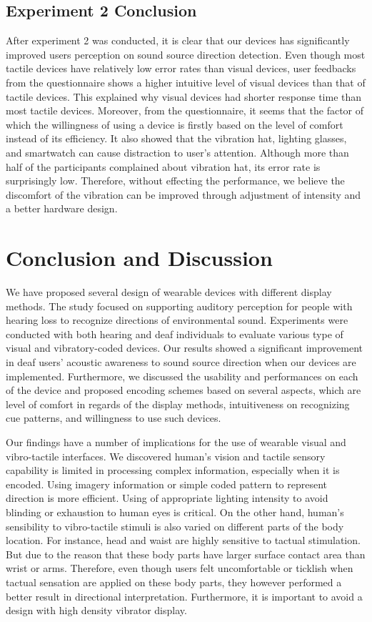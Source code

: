 \documentclass{sigchi}
\begin{document}
\subsection{Experiment 2 Conclusion}
After experiment 2 was conducted, it is clear that our devices has significantly improved users perception on sound source direction detection. Even though most tactile devices have relatively low error rates than visual devices, user feedbacks from the questionnaire shows a higher intuitive level of visual devices than that of tactile devices. This explained why visual devices had shorter response time than most tactile devices. Moreover, from the questionnaire, it seems that the factor of which the willingness of using a device is firstly based on the level of comfort instead of its efficiency. It also showed that the vibration hat, lighting glasses, and smartwatch can cause distraction to user's attention. Although more than half of the participants complained about vibration hat, its error rate is surprisingly low. Therefore, without effecting the performance, we believe the discomfort of the vibration can be improved through adjustment of intensity and a better hardware design.

\section{Conclusion and Discussion}
We have proposed several design of wearable devices with different display methods. The study focused on supporting auditory perception for people with hearing loss to recognize directions of environmental sound. Experiments were conducted with both hearing and deaf individuals to evaluate various type of visual and vibratory-coded devices. Our results showed a significant improvement in deaf users' acoustic awareness to sound source direction when our devices are implemented. Furthermore, we discussed the usability and performances on each of the device and proposed encoding schemes based on several aspects, which are level of comfort in regards of the display methods, intuitiveness on recognizing cue patterns, and willingness to use such devices.

Our findings have a number of implications for the use of wearable visual and vibro-tactile interfaces. We discovered human's vision and tactile sensory capability is limited in processing complex information, especially when it is encoded. Using imagery information or simple coded pattern to represent direction is more efficient. Using of appropriate lighting intensity to avoid blinding or exhaustion to human eyes is critical. On the other hand, human's sensibility to vibro-tactile stimuli is also varied on different parts of the body location. For instance, head and waist are highly sensitive to tactual stimulation. But due to the reason that these body parts have larger surface contact area than wrist or arms. Therefore, even though users felt uncomfortable or ticklish when tactual sensation are applied on these body parts, they however performed a better result in directional interpretation. Furthermore, it is important to avoid a design with high density vibrator display.
\end{document}

